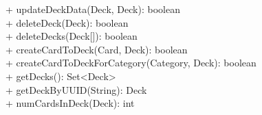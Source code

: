{
    + updateDeckData(Deck, Deck): boolean \\
    + deleteDeck(Deck): boolean \\
    + deleteDecks(Deck[]): boolean \\
    + createCardToDeck(Card, Deck): boolean \\
    + createCardToDeckForCategory(Category, Deck): boolean \\
    + getDecks(): Set<Deck> \\
    + getDeckByUUID(String): Deck \\
    + numCardsInDeck(Deck): int
}{}
